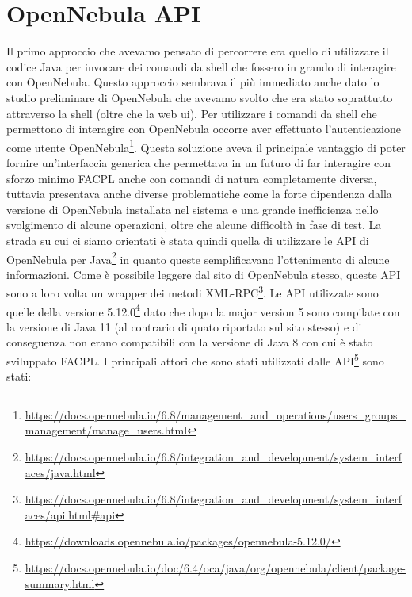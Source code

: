 \section{OpenNebula API}
Il primo approccio che avevamo pensato di percorrere era quello di utilizzare il codice Java per invocare dei comandi da shell che fossero in grando di interagire con OpenNebula. Questo approccio sembrava il più immediato anche dato lo studio preliminare di OpenNebula che avevamo svolto che era stato soprattutto attraverso la shell (oltre che la web ui).\medbreak
Per utilizzare i comandi da shell che permettono di interagire con OpenNebula occorre aver effettuato l'autenticazione come utente OpenNebula\footnote{\url{https://docs.opennebula.io/6.8/management_and_operations/users_groups_management/manage_users.html}}.
Questa soluzione aveva il principale vantaggio di poter fornire un'interfaccia generica che permettava in un futuro di far interagire con sforzo minimo FACPL anche con comandi di natura completamente diversa, tuttavia presentava anche diverse problematiche come la forte dipendenza dalla versione di OpenNebula installata nel sistema e una grande inefficienza nello svolgimento di alcune operazioni, oltre che alcune difficoltà in fase di test.\medbreak
La strada su cui ci siamo orientati è stata quindi quella di utilizzare le API di OpenNebula per Java\footnote{\url{https://docs.opennebula.io/6.8/integration_and_development/system_interfaces/java.html}} in quanto queste semplificavano l'ottenimento di alcune informazioni. Come è possibile leggere dal sito di OpenNebula stesso, queste API sono a loro volta un wrapper dei metodi XML-RPC\footnote{\url{https://docs.opennebula.io/6.8/integration_and_development/system_interfaces/api.html\#api}}.
Le API utilizzate sono quelle della versione 5.12.0\footnote{\url{https://downloads.opennebula.io/packages/opennebula-5.12.0/}} dato che dopo la major version 5 sono compilate con la versione di Java 11 (al contrario di quato riportato sul sito stesso) e di conseguenza non erano compatibili con la versione di Java 8 con cui è stato sviluppato FACPL.
I principali attori che sono stati utilizzati dalle API\footnote{\url{https://docs.opennebula.io/doc/6.4/oca/java/org/opennebula/client/package-summary.html}} sono stati:
